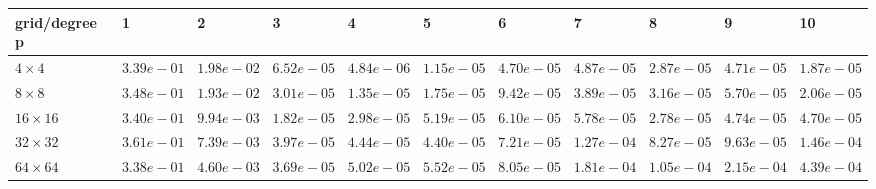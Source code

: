 \begin{tabular}{lllllllllll}
\hline
 grid/degree p   & 1          & 2          & 3          & 4          & 5          & 6          & 7          & 8          & 9          & 10         \\
\hline
 $4 \times 4$    & $3.39e-01$ & $1.98e-02$ & $6.52e-05$ & $4.84e-06$ & $1.15e-05$ & $4.70e-05$ & $4.87e-05$ & $2.87e-05$ & $4.71e-05$ & $1.87e-05$ \\
 $8 \times 8$    & $3.48e-01$ & $1.93e-02$ & $3.01e-05$ & $1.35e-05$ & $1.75e-05$ & $9.42e-05$ & $3.89e-05$ & $3.16e-05$ & $5.70e-05$ & $2.06e-05$ \\
 $16 \times 16$  & $3.40e-01$ & $9.94e-03$ & $1.82e-05$ & $2.98e-05$ & $5.19e-05$ & $6.10e-05$ & $5.78e-05$ & $2.78e-05$ & $4.74e-05$ & $4.70e-05$ \\
 $32 \times 32$  & $3.61e-01$ & $7.39e-03$ & $3.97e-05$ & $4.44e-05$ & $4.40e-05$ & $7.21e-05$ & $1.27e-04$ & $8.27e-05$ & $9.63e-05$ & $1.46e-04$ \\
 $64 \times 64$  & $3.38e-01$ & $4.60e-03$ & $3.69e-05$ & $5.02e-05$ & $5.52e-05$ & $8.05e-05$ & $1.81e-04$ & $1.05e-04$ & $2.15e-04$ & $4.39e-04$ \\
\hline
\end{tabular}